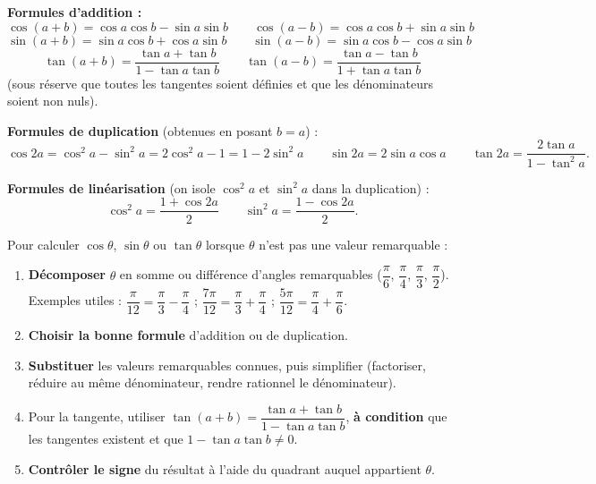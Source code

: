 \documentclass[11pt]{article}
\begin{document}
\begin{aretenir}
\textbf{Formules d'addition :}
\[ \cos(a+b)=\cos a\cos b-\sin a\sin b \qquad \cos(a-b)=\cos a\cos b+\sin a\sin b \]
\[ \sin(a+b)=\sin a\cos b+\cos a\sin b \qquad \sin(a-b)=\sin a\cos b-\cos a\sin b \]
\[ \tan(a+b)=\dfrac{\tan a+\tan b}{1-\tan a\tan b} \qquad \tan(a-b)=\dfrac{\tan a-\tan b}{1+\tan a\tan b} \]
(sous réserve que toutes les tangentes soient définies et que les dénominateurs soient non nuls).

\textbf{Formules de duplication} (obtenues en posant $b=a$) :
\[ \cos 2a=\cos^2 a-\sin^2 a=2\cos^2 a-1=1-2\sin^2 a \qquad \sin 2a=2\sin a\cos a \qquad \tan 2a=\dfrac{2\tan a}{1-\tan^2 a}. \]

\textbf{Formules de linéarisation} (on isole $\cos^2 a$ et $\sin^2 a$ dans la duplication) :
\[ \cos^2 a=\dfrac{1+\cos 2a}{2} \qquad \sin^2 a=\dfrac{1-\cos 2a}{2}. \]
\end{aretenir}

\begin{methode}
Pour calculer $\cos\theta$, $\sin\theta$ ou $\tan\theta$ lorsque $\theta$ n'est pas une valeur remarquable :
\begin{enumerate}
\item \textbf{Décomposer} $\theta$ en somme ou différence d'angles remarquables ($\dfrac{\pi}{6}$, $\dfrac{\pi}{4}$, $\dfrac{\pi}{3}$, $\dfrac{\pi}{2}$). Exemples utiles : $\dfrac{\pi}{12}=\dfrac{\pi}{3}-\dfrac{\pi}{4}$ ; $\dfrac{7\pi}{12}=\dfrac{\pi}{3}+\dfrac{\pi}{4}$ ; $\dfrac{5\pi}{12}=\dfrac{\pi}{4}+\dfrac{\pi}{6}$.
\item \textbf{Choisir la bonne formule} d'addition ou de duplication.
\item \textbf{Substituer} les valeurs remarquables connues, puis simplifier (factoriser, réduire au même dénominateur, rendre rationnel le dénominateur).
\item Pour la tangente, utiliser $\tan(a+b)=\dfrac{\tan a+\tan b}{1-\tan a\tan b}$, \textbf{à condition} que les tangentes existent et que $1-\tan a\tan b\neq 0$.
\item \textbf{Contrôler le signe} du résultat à l'aide du quadrant auquel appartient $\theta$.
\end{enumerate}
\end{methode}
\end{document}
